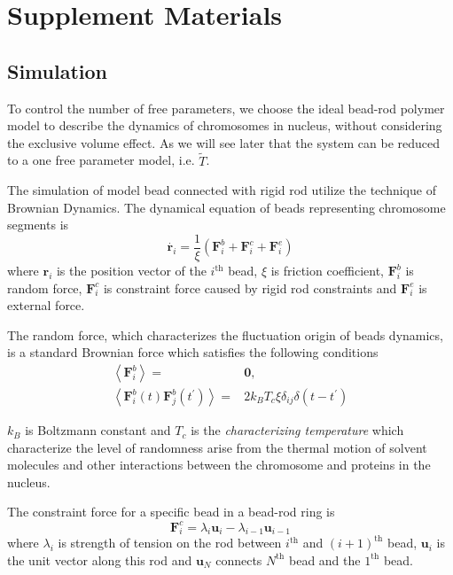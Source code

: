 \documentclass{article}
\begin{document}
\section{Supplement Materials}


\subsection{Simulation}
\label{sub:simulation}
To control the number of free parameters, we choose the ideal bead-rod polymer model to describe the dynamics of chromosomes in nucleus, without considering the exclusive volume effect. 
As we will see later that the system can be reduced to a one free parameter model, i.e. $\tilde{T}$. 

The simulation of model bead connected with rigid rod utilize the technique of Brownian Dynamics\cite{Cruz2012}.
The dynamical equation of beads representing chromosome segments is
\begin{equation}
	\label{eq:differential}
	\dot{\mathbf{r}_i} = \frac{1}{\xi}(\mathbf{F}_i^b + \mathbf{F}_i^c + \mathbf{F}_i^e) 
\end{equation}
where $\mathbf{r}_i$ is the position vector of the $i^{\text{th}}$ bead, $\xi$ is friction coefficient, $\mathbf{F}_i^b$ is random force, $\mathbf{F}_i^c$ is constraint force caused by rigid rod constraints and $\mathbf{F}_i^e$ is external force.

The random force, which characterizes the fluctuation origin of beads dynamics, is a standard Brownian force which satisfies the following conditions
\begin{subequations}
\begin{align}
	\left\langle\mathbf{F}_i^b\right\rangle=& \mathbf{0}, \\
	\left\langle\mathbf{F}_i^b (t)\mathbf{F}_j^b (t^{\prime}) \right\rangle=&2k_B T_{c} \xi\delta_{ij}\delta(t-t^{\prime})
\end{align}
\end{subequations}

$k_B$ is Boltzmann constant and $T_{c}$ is the \emph{characterizing temperature} which characterize the level of randomness arise from the thermal motion of solvent molecules and other interactions between the chromosome and proteins in the nucleus.

The constraint force for a specific bead in a bead-rod ring is
\begin{equation}
	\mathbf{F}_i^c = \lambda_i \mathbf{u}_i - \lambda_{i-1} \mathbf{u}_{i-1}
\end{equation}
where $\lambda_i$ is strength of tension on the rod between $i^{\text{th}}$ and $(i+1)^{\text{th}}$ bead, $\mathbf{u}_i$ is the unit vector along this rod and $\mathbf{u}_{N}$ connects $N^{\text{th}}$ bead and the $1^{\text{th}}$ bead. 
\end{document}
